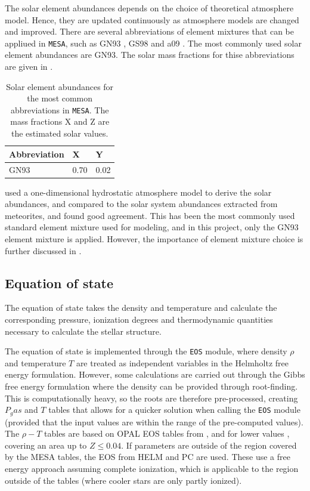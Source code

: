The solar element abundances depends on the choice of theoretical atmosphere model. Hence, they are updated continuously as atmosphere models are changed and improved. There are several abbreviations of element mixtures that can be appliued in \texttt{MESA}, such as GN93 \citep{grevesse1993cosmic}, GS98 \citep{grevesse1998standard} and a09 \citep{asplund2009chemical}. The most commonly used solar element abundances are GN93. The solar mass fractions for thise abbreviations are given in .

\begin{table}[htbp]
    \begin{tabular}{lll}
    \hline
    \multicolumn{1}{|l}{Abbreviation} & X & \multicolumn{1}{l|}{Y} \\ \hline
                  GN93   &  0.70 & 0.02                        \\
    \end{tabular}
    \caption{Solar element abundances for the most common abbreviations in \texttt{MESA}. The mass fractions X and Z are the estimated solar values.}
\label{tab:solar}
\end{table}

\citet{grevesse1993cosmic} used a one-dimensional hydrostatic atmosphere model to derive the solar abundances, and compared to the solar system abundances extracted from meteorites, and found good agreement. This has been the most commonly used standard element mixture used for modeling, and in this project, only the GN93 element mixture is applied. However, the importance of element mixture choice is further discussed in . 

\subsection{Equation of state}

The equation of state takes the density and temperature and calculate the corresponding pressure, ionization degrees and thermodynamic quantities necessary to calculate the stellar structure. 

The equation of state is implemented through the \texttt{EOS} module, where density $\rho$ and temperature $T$ are treated as independent variables in the Helmholtz free energy formulation. However, some calculations are carried out through the Gibbs free energy formulation where the density can be provided through root-finding. This is computationally heavy, so the roots are therefore pre-processed, creating $P_gas$ and $T$ tables that allows for a quicker solution when calling the \texttt{EOS} module (provided that the input values are within the range of the pre-computed values). The $\rho-T$ tables are based on OPAL EOS tables from \citet{rogers2002updated}, and for lower values \citet{saumon1995equation}, covering an area up to $Z \leqslant 0.04$. If parameters are outside of the region covered by the MESA tables, the EOS from HELM \citep{timmes2000accuracy} and PC \citep{potekhin2010thermodynamic} are used. These use a free energy approach assuming complete ionization, which is applicable to the region outside of the tables (where cooler stars are only partly ionized). 

